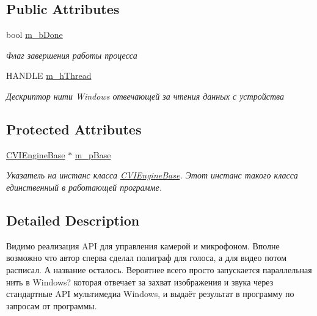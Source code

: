 \subsection*{Public Attributes}
\begin{DoxyCompactItemize}
\item 
bool \hyperlink{class_c_v_i_engine_audio2_a9554d5bac2f77277384394c21fd407bb}{m\+\_\+b\+Done}
\begin{DoxyCompactList}\small\item\em Флаг завершения работы процесса \end{DoxyCompactList}\item 
H\+A\+N\+D\+L\+E \hyperlink{class_c_v_i_engine_audio2_ac3643ec0788589e78238776f56b9d796}{m\+\_\+h\+Thread}
\begin{DoxyCompactList}\small\item\em Дескриптор нити Windows отвечающей за чтения данных с устройства \end{DoxyCompactList}\end{DoxyCompactItemize}
\subsection*{Protected Attributes}
\begin{DoxyCompactItemize}
\item 
\hyperlink{class_c_v_i_engine_base}{C\+V\+I\+Engine\+Base} $\ast$ \hyperlink{class_c_v_i_engine_audio2_a63d3b5cc992e619dc07d688c16403af2}{m\+\_\+p\+Base}
\begin{DoxyCompactList}\small\item\em Указатель на инстанс класса \hyperlink{class_c_v_i_engine_base}{C\+V\+I\+Engine\+Base}. Этот инстанс такого класса единственный в работающей программе. \end{DoxyCompactList}\end{DoxyCompactItemize}


\subsection{Detailed Description}
Видимо реализация A\+P\+I для управления камерой и микрофоном. Вполне возможно что автор сперва сделал полиграф для голоса, а для видео потом расписал. А название осталось. Вероятнее всего просто запускается параллельная нить в Windows? которая отвечает за захват изображения и звука через стандартные A\+P\+I мультимедиа Windows, и выдаёт результат в программу по запросам от программы. 



